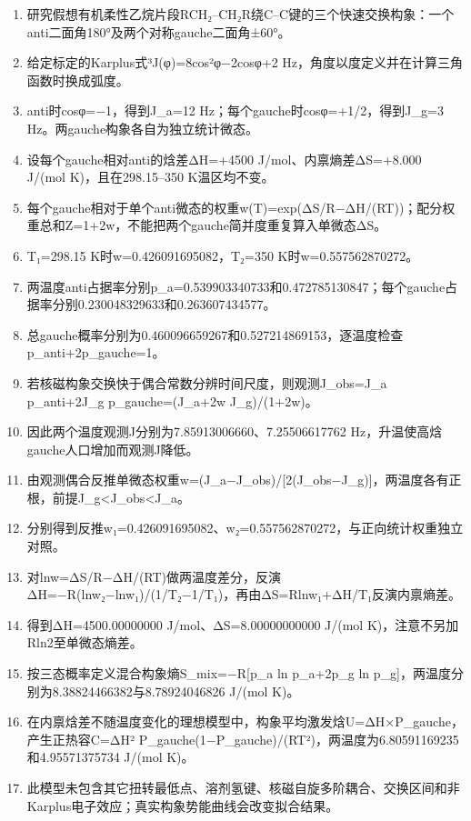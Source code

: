 \documentclass[UTF8,11pt,a4paper]{ctexart}
\begin{document}
\begin{enumerate}
\item 研究假想有机柔性乙烷片段RCH₂–CH₂R绕C–C键的三个快速交换构象：一个anti二面角180°及两个对称gauche二面角±60°。
\item 给定标定的Karplus式³J(φ)=8cos²φ−2cosφ+2 Hz，角度以度定义并在计算三角函数时换成弧度。
\item anti时cosφ=−1，得到J\_a=12 Hz；每个gauche时cosφ=+1/2，得到J\_g=3 Hz。两gauche构象各自为独立统计微态。
\item 设每个gauche相对anti的焓差ΔH=+4500 J/mol、内禀熵差ΔS=+8.000 J/(mol K)，且在298.15–350 K温区均不变。
\item 每个gauche相对于单个anti微态的权重w(T)=exp(ΔS/R−ΔH/(RT))；配分权重总和Z=1+2w，不能把两个gauche简并度重复算入单微态ΔS。
\item T₁=298.15 K时w=0.426091695082，T₂=350 K时w=0.557562870272。
\item 两温度anti占据率分别p\_a=0.539903340733和0.472785130847；每个gauche占据率分别0.230048329633和0.263607434577。
\item 总gauche概率分别为0.460096659267和0.527214869153，逐温度检查p\_anti+2p\_gauche=1。
\item 若核磁构象交换快于偶合常数分辨时间尺度，则观测J\_obs=J\_a p\_anti+2J\_g p\_gauche=(J\_a+2w J\_g)/(1+2w)。
\item 因此两个温度观测J分别为7.85913006660、7.25506617762 Hz，升温使高焓gauche人口增加而观测J降低。
\item 由观测偶合反推单微态权重w=(J\_a−J\_obs)/[2(J\_obs−J\_g)]，两温度各有正根，前提J\_g<J\_obs<J\_a。
\item 分别得到反推w₁=0.426091695082、w₂=0.557562870272，与正向统计权重独立对照。
\item 对lnw=ΔS/R−ΔH/(RT)做两温度差分，反演ΔH=−R(lnw₂−lnw₁)/(1/T₂−1/T₁)，再由ΔS=Rlnw₁+ΔH/T₁反演内禀熵差。
\item 得到ΔH=4500.00000000 J/mol、ΔS=8.00000000000 J/(mol K)，注意不另加Rln2至单微态熵差。
\item 按三态概率定义混合构象熵S\_mix=−R[p\_a ln p\_a+2p\_g ln p\_g]，两温度分别为8.38824466382与8.78924046826 J/(mol K)。
\item 在内禀焓差不随温度变化的理想模型中，构象平均激发焓U=ΔH×P\_gauche，产生正热容C=ΔH² P\_gauche(1−P\_gauche)/(RT²)，两温度为6.80591169235和4.95571375734 J/(mol K)。
\item 此模型未包含其它扭转最低点、溶剂氢键、核磁自旋多阶耦合、交换区间和非Karplus电子效应；真实构象势能曲线会改变拟合结果。
\end{enumerate}
\end{document}
